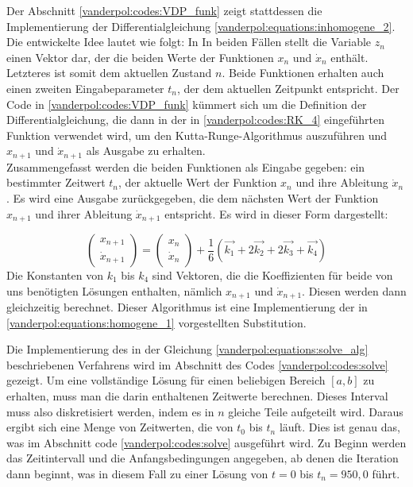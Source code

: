 \break

Der Abschnitt \ref{vanderpol:codes:VDP_funk} zeigt stattdessen die Implementierung der Differentialgleichung \ref{vanderpol:equations:inhomogene_2}.  Die entwickelte Idee lautet wie folgt: In In beiden Fällen stellt die Variable $z_n$ einen Vektor dar, der die beiden Werte der Funktionen $x_n$ und $\dot{x}_n$ enthält. Letzteres ist somit dem aktuellen Zustand $n$. Beide Funktionen erhalten auch einen zweiten Eingabeparameter $t_n$, der dem aktuellen Zeitpunkt entspricht. Der Code in \ref{vanderpol:codes:VDP_funk} kümmert sich um die Definition der Differentialgleichung, die dann in der in \ref{vanderpol:codes:RK_4} eingeführten Funktion verwendet wird, um den Kutta-Runge-Algorithmus auszuführen und $x_{n+1}$ und $\dot{x}_{n+1}$ als Ausgabe zu erhalten.\\
Zusammengefasst werden die beiden Funktionen als Eingabe gegeben: ein bestimmter Zeitwert $t_n$, der aktuelle Wert der Funktion $x_{n}$ und ihre Ableitung $\dot{x}_{n}$. Es wird eine Ausgabe zurückgegeben, die dem nächsten Wert der Funktion $x_{n+1}$ und ihrer Ableitung $\dot{x}_{n+1}$ entspricht. Es wird in dieser Form dargestellt:

\begin{equation}
\begin{pmatrix}x_{n+1} \\ \dot{x}_{n+1} \end{pmatrix} = \begin{pmatrix}x_{n} \\ \dot{x}_{n} \end{pmatrix} + \frac{1}{6}(\vec{k_1} + 2\vec{k_2} + 2\vec{k_3} + \vec{k_4})
\label{vanderpol:equations:solve_alg}
\end{equation}
Die Konstanten von $k_1$ bis $k_4$ sind Vektoren, die die Koeffizienten für beide von uns benötigten Lösungen enthalten, nämlich $x_{n+1}$ und $\dot{x}_{n+1}$.
Diesen werden dann gleichzeitig berechnet. Dieser Algorithmus ist eine Implementierung der in \ref{vanderpol:equations:homogene_1} vorgestellten Substitution.

Die Implementierung des in der Gleichung \ref{vanderpol:equations:solve_alg} beschriebenen Verfahrens wird im Abschnitt des Codes \ref{vanderpol:codes:solve} gezeigt.
Um eine vollständige Lösung für einen beliebigen Bereich $[a, b]$ zu erhalten, muss man die darin enthaltenen Zeitwerte berechnen. Dieses Interval muss also diskretisiert werden, indem es in $n$ gleiche Teile aufgeteilt wird. Daraus ergibt sich eine Menge von Zeitwerten, die von $t_0$ bis $t_n$ läuft.
Dies ist genau das, was im Abschnitt code \ref{vanderpol:codes:solve} ausgeführt wird. Zu Beginn werden das Zeitintervall und die Anfangsbedingungen angegeben, ab denen die Iteration dann beginnt, was in diesem Fall zu einer Lösung von $t=0$ bis $t_n=950,0$ führt.

